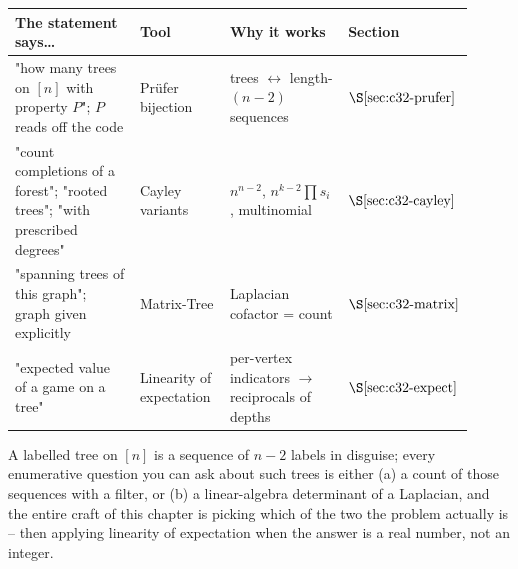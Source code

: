 \begin{center}
\renewcommand{\arraystretch}{1.25}
\setlength{\tabcolsep}{3pt}
\begin{tabular}{@{}p{0.30\linewidth} p{0.20\linewidth} p{0.28\linewidth} >{\raggedright\arraybackslash}p{0.13\linewidth}@{}}
\toprule
\textbf{The statement says\dots} & \textbf{Tool} & \textbf{Why it works} & \textbf{Section}\\
\midrule
"how many trees on \([n]\) with property \(P\)"; \(P\) reads off the code & Pr\"ufer bijection & trees \(\leftrightarrow\) length-\((n-2)\) sequences & \(\secref{c32-prufer}\)\\
"count completions of a forest"; "rooted trees"; "with prescribed degrees" & Cayley variants & \(n^{n-2}\), \(n^{k-2}\prod s_i\), multinomial & \(\secref{c32-cayley}\)\\
"spanning trees of this graph"; graph given explicitly & Matrix-Tree & Laplacian cofactor = count & \(\secref{c32-matrix}\)\\
"expected value of a game on a tree" & Linearity of expectation & per-vertex indicators \(\to\) reciprocals of depths & \(\secref{c32-expect}\)\\
\bottomrule
\end{tabular}
\end{center}

\begin{insightbox}
A labelled tree on \([n]\) is a sequence of \(n-2\) labels in disguise; every
enumerative question you can ask about such trees is either (a) a count of
those sequences with a filter, or (b) a linear-algebra determinant of a
Laplacian, and the entire craft of this chapter is picking which of the two
the problem actually is -- then applying linearity of expectation when the
answer is a real number, not an integer.
\end{insightbox}

